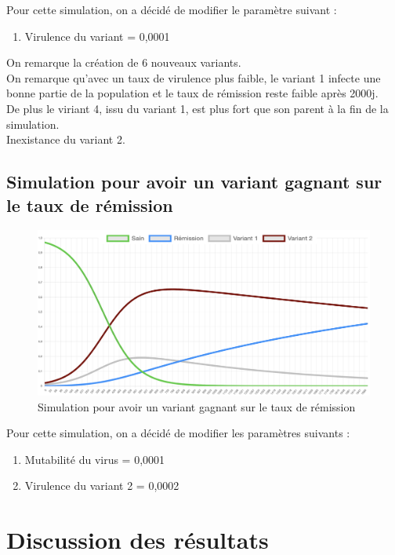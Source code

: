 \documentclass{article}
\begin{document}
Pour cette simulation, on a décidé de modifier le paramètre suivant :
\begin{enumerate}
    \item Virulence du variant = 0,0001 \\
\end{enumerate}
\noindent
On remarque la création de 6 nouveaux variants. \\

On remarque qu'avec un taux de virulence plus faible, le variant 1 infecte une bonne partie de la population et le taux de rémission reste faible après 2000j. \\
De plus le viriant 4, issu du variant 1, est plus fort que son parent à la fin de la simulation. \\
Inexistance du variant 2.


\subsection{Simulation pour avoir un variant gagnant sur le taux de rémission}

\begin{figure}[h]
    \includegraphics[width=\linewidth]{images/Simulation5.png}
    \caption{Simulation pour avoir un variant gagnant sur le taux de rémission}
    \label{fig:simulation5}
\end{figure}

Pour cette simulation, on a décidé de modifier les paramètres suivants :
\begin{enumerate}
    \item Mutabilité du virus = 0,0001
    \item Virulence du variant 2 = 0,0002
\end{enumerate}


\section{Discussion des résultats}
\end{document}
